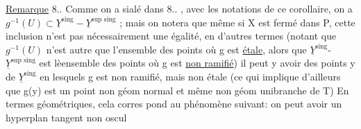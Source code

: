 \uline{Remarque} 8..  Comme on a sialé dans  8.. , avec les notations de
ce corollaire, on a  $g^{-1}(U) \subset \underline{Y}^{\text{sing}} - \underline{Y}^{\text{sup sing}}$ ; mais on notera que
même si X est fermé dans P,  cette inclusion n'est pas nécessairement
\margin{\unsure{$\ast$}} une égalité, en d'autres termes (notant que $g^{-1}(U)$ n'est autre que
l'ensemble des points où g est \uline{étale}, alors que $\underline{Y}^{\text{sing}}$-$\underline{Y}^{\text{sup sing}}$ est
lèensemble des points où g est \uline{non ramifié}) il peut y avoir des points
y de $\underline{Y}^{\text{sing}}$ en lesquels  g est  non ramifié, mais non étale (ce qui
 implique d'ailleurs que g(y) est un point non  géom normal et même
non géom unibranche de  T)  En termes géométriques, cela corres%
pond au phénomène suivant: on peut avoir un hyperplan tangent non oscul
